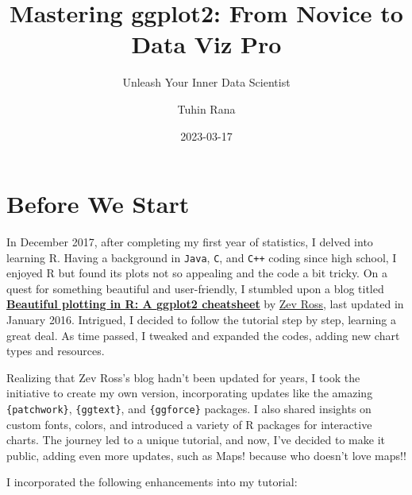 \documentclass[
  letterpaper,
]{scrbook}
\title{Mastering ggplot2: From Novice to Data Viz Pro}
\subtitle{Unleash Your Inner Data Scientist}
\author{Tuhin Rana}
\date{2023-03-17}
\renewcommand*\contentsname{Table of contents}
\newcommand\contentsname{Table of contents}
\begin{document}
\frontmatter
\maketitle

\renewcommand*\contentsname{Table of Contents}
{
\hypersetup{linkcolor=}
\setcounter{tocdepth}{1}
\tableofcontents
}
\listoffigures
\listoftables
\mainmatter
{}

\chapter*{Before We Start}\label{before-we-start}


In December 2017, after completing my first year of statistics, I delved
into learning R. Having a background in \texttt{Java}, \texttt{C}, and
\texttt{C++} coding since high school, I enjoyed R but found its plots
not so appealing and the code a bit tricky. On a quest for something
beautiful and user-friendly, I stumbled upon a blog titled
\href{http://zevross.com/blog/2014/08/04/beautiful-plotting-in-r-a-ggplot2-cheatsheet-3/}{\textbf{Beautiful
plotting in R: A ggplot2 cheatsheet}} by
\href{https://twitter.com/zevross}{Zev Ross}, last updated in January
2016. Intrigued, I decided to follow the tutorial step by step, learning
a great deal. As time passed, I tweaked and expanded the codes, adding
new chart types and resources.

Realizing that Zev Ross's blog hadn't been updated for years, I took the
initiative to create my own version, incorporating updates like the
amazing \texttt{\{patchwork\}}, \texttt{\{ggtext\}}, and
\texttt{\{ggforce\}} packages. I also shared insights on custom fonts,
colors, and introduced a variety of R packages for interactive charts.
The journey led to a unique tutorial, and now, I've decided to make it
public, adding even more updates, such as Maps! because who doesn't love
maps!!

I incorporated the following enhancements into my tutorial:
\end{document}
